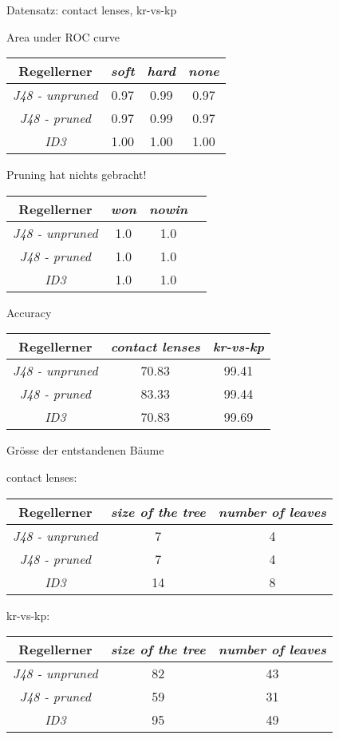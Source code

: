 
Datensatz: contact lenses, kr-vs-kp

Area under ROC curve

\begin{tabular}{c|c|c|c}
				Regellerner       & \emph{soft} & \emph{hard} & \emph{none}  \\ \hline
				\emph{J48 - unpruned} & 0.97 & 0.99 & 0.97  \\ \hline
				\emph{J48 - pruned}  & 0.97 & 0.99 & 0.97 \\ \hline
				\emph{ID3}  & 1.00 & 1.00 & 1.00 \\ \hline
\end{tabular}

Pruning hat nichts gebracht!


\begin{tabular}{c|c|c|c}
				Regellerner       & \emph{won} & \emph{nowin} \\ \hline
				\emph{J48 - unpruned} & 1.0 & 1.0  \\ \hline
				\emph{J48 - pruned}  & 1.0 & 1.0  \\ \hline
				\emph{ID3}  & 1.0 & 1.0 \\ \hline
\end{tabular}


Accuracy

\begin{tabular}{c|c|c}
				Regellerner       & \emph{contact lenses} & \emph{kr-vs-kp}  \\ \hline
				\emph{J48 - unpruned}  & 70.83 & 99.41 \\ \hline
				\emph{J48 - pruned} & 83.33  & 99.44 \\ \hline
				\emph{ID3}  & 70.83 & 99.69\\ \hline
\end{tabular}

Gr\"osse der entstandenen B\"aume

contact lenses:

\begin{tabular}{c|c|c}
	Regellerner       & \emph{size of the tree} & \emph{number of leaves}  \\ \hline
	\emph{J48 - unpruned}  & 7 & 4 \\ \hline
	\emph{J48 - pruned} & 7  & 4 \\ \hline
	\emph{ID3}  & 14 & 8\\ \hline
\end{tabular}


kr-vs-kp:

\begin{tabular}{c|c|c}
	Regellerner       & \emph{size of the tree} & \emph{number of leaves}  \\ \hline
	\emph{J48 - unpruned}  & 82 & 43 \\ \hline
	\emph{J48 - pruned} & 59  & 31 \\ \hline
	\emph{ID3}  & 95 & 49\\ \hline
\end{tabular}
